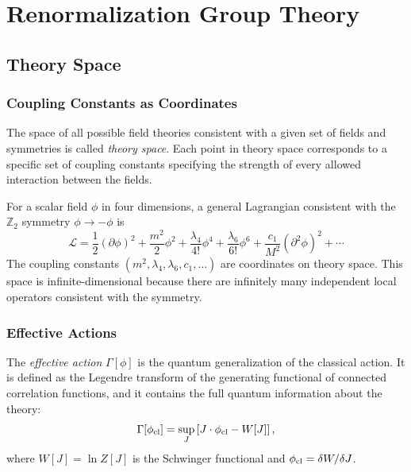\documentclass[12pt,a4paper,oneside]{book}
\theoremstyle{definition}
\theoremstyle{plain}
\theoremstyle{remark}
\begin{document}
\part{Renormalization Group Theory}

\chapter{Theory Space}

\section{Coupling Constants as Coordinates}

The space of all possible field theories consistent with a given set of fields
and symmetries is called \emph{theory space}. Each point in theory space
corresponds to a specific set of coupling constants specifying the strength
of every allowed interaction between the fields.

For a scalar field $\phi$ in four dimensions, a general Lagrangian consistent
with the $\mathbb{Z}_2$ symmetry $\phi \to -\phi$ is
\begin{equation}
\mathcal{L} = \frac{1}{2}(\partial\phi)^2 + \frac{m^2}{2}\phi^2 + \frac{\lambda_4}{4!}\phi^4
+ \frac{\lambda_6}{6!}\phi^6 + \frac{c_1}{M^2}(\partial^2\phi)^2 + \cdots
\end{equation}
The coupling constants $(m^2, \lambda_4, \lambda_6, c_1, \ldots)$ are coordinates
on theory space. This space is infinite-dimensional because there are infinitely
many independent local operators consistent with the symmetry.

\section{Effective Actions}

The \emph{effective action} $\Gamma[\phi]$ is the quantum generalization of
the classical action. It is defined as the Legendre transform of the
generating functional of connected correlation functions, and it contains
the full quantum information about the theory:
\begin{equation}
\Gamma[\phi_{\rm cl}] = \sup_J\left[J\cdot\phi_{\rm cl} - W[J]\right],
\end{equation}
where $W[J] = \ln Z[J]$ is the Schwinger functional and $\phi_{\rm cl} = \delta W/\delta J$.
\end{document}
